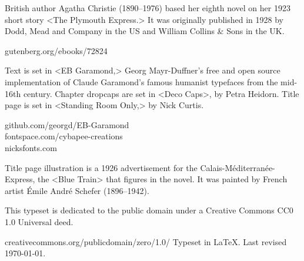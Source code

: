 \documentclass[
paper=5.5in:8.5in,
]{scrbook} %
\begin{document}
\centering
\begin{minipage}{\textwidth}
British author Agatha Christie (1890--1976) based her eighth novel  on her 1923 short story <The Plymouth Express.> It was originally published in 1928 by Dodd, Mead and Company in the US and  William Collins \& Sons in the UK.
\end{minipage}
\vfill
gutenberg.org/ebooks/72824
\vfill
\divider
\vfill
\begin{minipage}{\textwidth}
Text is set in <EB Garamond,> Georg Mayr-Duffner's free and open source implementation of Claude Garamond’s famous humanist typefaces from the mid-16th century. Chapter dropcaps are set in <Deco Caps>, by Petra Heidorn. Title page is set in <Standing Room Only,> by Nick Curtis.
\end{minipage}
\vfill
 github.com/georgd/EB-Garamond\\fontspace.com/cybapee-creations\\nicksfonts.com
 \vfill
\divider
\vfill
\begin{minipage}{\textwidth}
Title page illustration is a 1926 advertisement for the Calais-Méditerranée-Express, the <Blue Train> that figures in the novel. It was painted by French artist Émile André Schefer (1896--1942).
\end{minipage}
\vfill
\divider
\vfill
\begin{minipage}{\textwidth}
This typeset is dedicated to the public domain under a Creative Commons CC0 1.0 Universal deed. 
\end{minipage}
\vfill
creativecommons.org/publicdomain/zero/1.0/
\vfill
\divider
\vfill
Typeset in \LaTeX{}. Last revised \today.
\thispagestyle{empty}
\end{document}
